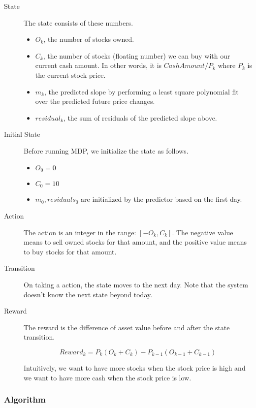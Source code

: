 \documentclass[12pt]{article}
\begin{document}
\begin{description}
\item[State] The state consists of these numbers. 
  \begin{itemize}
  \item $O_k$, the number of stocks owned.
  \item $C_k$, the number of stocks (floating number) we can buy with
    our current cash amount. In other words, it is $CashAmount/P_{k}$
    where $P_k$ is the current stock price.
    \item $m_k$, the predicted slope by performing a least square
      polynomial fit over the predicted future price changes.
    \item $residual_k$, the sum of residuals of the predicted slope
      above.
  \end{itemize}

\item[Initial State] Before running MDP, we initialize the state as follows.
  \begin{itemize}
  \item $O_0 = 0$
  \item $C_0 = 10$
  \item $m_0, residuals_0$ are initialized by the predictor based on the first day.
  \end{itemize}
  
\item[Action] The action is an integer in the range: $[-O_k,C_k]$. The
  negative value means to sell owned stocks for that amount, and the
  positive value means to buy stocks for that amount.

\item[Transition] On taking a action, the state moves to the next
  day. Note that the system doesn't know the next state beyond today.

\item[Reward] The reward is the difference of asset value before and
  after the state transition. 
  
  \[
  Reward_k = P_k(O_{k} + C_{k}) - P_{k-1}(O_{k-1} + C_{k-1})
  \]
  
  Intuitively, we want to have more stocks when the stock price is
  high and we want to have more cash when the stock price is low.
\end{description}

\subsubsection{Algorithm}
\end{document}
